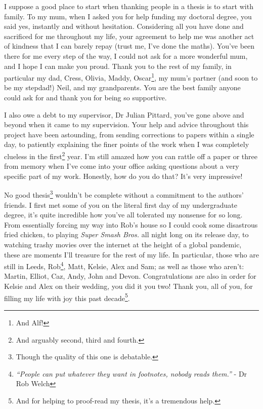 

\begin{acknowledgements}      %

\setlength{\parindent}{17.62482pt}
\setlength{\parskip}{0.0pt plus 1.0pt}

I suppose a good place to start when thanking people in a thesis is to start with family.
To my mum, when I asked you for help funding my doctoral degree, you said yes, instantly and without hesitation.
Considering all you have done and sacrificed for me throughout my life, your agreement to help me was another act of kindness that I can barely repay (trust me, I've done the maths).
You've been there for me every step of the way, I could not ask for a more wonderful mum, and I hope I can make you proud.
Thank you to the rest of my family, in particular my dad, Cress, Olivia, Maddy, Oscar\footnote{And Alf!}, my mum's partner (and soon to be my stepdad!) Neil, and my grandparents.
You are the best family anyone could ask for and thank you for being so supportive.

I also owe a debt to my supervisor, Dr Julian Pittard, you've gone above and beyond when it came to my supervision.
Your help and advice throughout this project have been astounding, from sending corrections to papers within a single day, to patiently explaining the finer points of the work when I was completely clueless in the first\footnote{And arguably second, third and fourth.} year.
I'm still amazed how you can rattle off a paper or three from memory when I've come into your office asking questions about a very specific part of my work.
Honestly, how do you do that? It's very impressive!

No good thesis\footnote{Though the quality of this one is debatable.} wouldn't be complete without a commitment to the authors' friends.
I first met some of you on the literal first day of my undergraduate degree, it's quite incredible how you've all tolerated my nonsense for so long.
From essentially forcing my way into Rob's house so I could cook some disastrous fried chicken, to playing \textit{Super Smash Bros.} all night long on its release day, to watching trashy movies over the internet at the height of a global pandemic, these are moments I'll treasure for the rest of my life.
In particular, those who are still in Leeds, Rob\footnote{\emph{``People can put whatever they want in footnotes, nobody reads them.''} - Dr Rob Welch}, Matt, Kelsie, Alex and Sam; as well as those who aren't: Martin, Elliot, Caz, Andy, John and Devon.
Congratulations are also in order for Kelsie and Alex on their wedding, you did it you two!
Thank you, all of you, for filling my life with joy this past decade\footnote{And for helping to proof-read my thesis, it's a tremendous help.}.


\end{acknowledgements}
